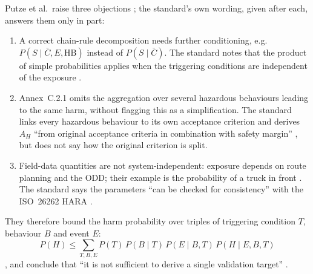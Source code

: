 \documentclass[11pt,a4paper]{article}
\begin{document}
Putze et al.\ raise three objections \cite[Sec.~IV-B(b)]{putze2023}; the standard's own wording, given after each, answers them only in part:
\begin{enumerate}
\item A correct chain-rule decomposition needs further conditioning, e.g.\ $P(S\mid \bar C, E, \mathrm{HB})$ instead of $P(S\mid\bar C)$. The standard notes that the product of simple probabilities applies when the triggering conditions are independent of the exposure \cite[C.2.1, Note~5, p.~127]{iso21448}.
\item Annex~C.2.1 omits the aggregation over several hazardous behaviours leading to the same harm, without flagging this as a simplification. The standard links every hazardous behaviour to its own acceptance criterion and derives $A_H$ ``from original acceptance criteria in combination with safety margin'' \cite[C.2.1, p.~126]{iso21448}, but does not say how the original criterion is split.
\item Field-data quantities are not system-independent: exposure depends on route planning and the ODD; their example is the probability of a truck in front \cite[Sec.~IV-B(c)]{putze2023}. The standard says the parameters ``can be checked for consistency'' with the ISO~26262 HARA \cite[C.2.1, Note~4, p.~127]{iso21448}.
\end{enumerate}
They therefore bound the harm probability over triples of triggering condition $T$, behaviour $B$ and event $E$:
\begin{equation}
P(H) \le \sum_{T,B,E} P(T)\,P(B\mid T)\,P(E\mid B,T)\,P(H\mid E,B,T)
\label{eq:bonf}
\end{equation}
\cite[Sec.~IV-B(b), Eq.~(2); severity-stratified form Eq.~(3)]{putze2023}, and conclude that ``it is not sufficient to derive a single validation target'' \cite[Sec.~IV-B(b), last paragraph]{putze2023}.
\end{document}
